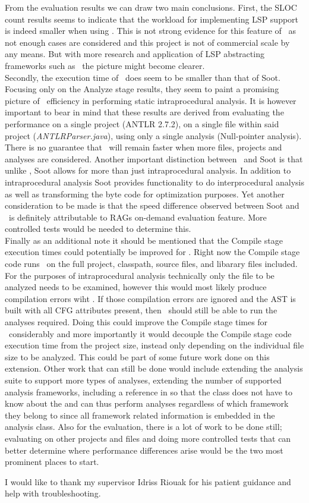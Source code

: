 \documentclass[sigplan,10pt]{acmart}
\begin{document}
From the evaluation results we can draw two main conclusions. First, the SLOC count results seems to indicate that the workload for implementing LSP support is indeed smaller when using \magpie. This is not strong evidence for this feature of \magpie\ as not enough cases are considered and this project is not of commercial scale by any means. But with more research and application of LSP abstracting frameworks such as \magpie\ the picture might become clearer. 
\\
Secondly, the execution time of \intraj\ does seem to be smaller than that of Soot. Focusing only on the Analyze stage results, they seem to paint a promising picture of \intraj\ efficiency in performing static intraprocedural analysis. It is however important to bear in mind that these results are derived from evaluating the performance on a single project (ANTLR 2.7.2), on a single file within said project (\textit{ANTLRParser.java}), using only a single analysis (Null-pointer analysis). There is no guarantee that \intraj\ will remain faster when more files, projects and analyses are considered. Another important distinction between \intraj\ and Soot is that unlike \intraj, Soot allows for more than just intraprocedural analysis. In addition to intraprocedural analysis Soot provides functionality to do interprocedural analysis as well as transforming the byte code for optimization purposes. Yet another consideration to be made is that the speed difference observed between Soot and \intraj\ is definitely attributable to RAGs on-demand evaluation feature. More controlled tests would be needed to determine this.
\\
Finally as an additional note it should be mentioned that the Compile stage execution times could potentially be improved for \intraj. Right now the Compile stage code runs \intraj\ on the full project, classpath, source files, and libarary files included. For the purposes of intraprocedural analysis technically only the file to be analyzed needs to be examined, however this would most likely produce compilation errors wiht \intraj. If those compilation errors are ignored and the AST is built with all CFG attributes present, then \intraj\ should still be able to run the analyses required. Doing this could improve the Compile stage times for \intraj\ considerably and more importantly it would decouple the Compile stage code execution time from the project size, instead only depending on the individual file size to be analyzed. This could be part of some future work done on this extension. Other work that can still be done would include extending the analysis suite to support more types of analyses, extending the number of supported analysis frameworks, including a  reference in  so that the  class does not have to know about the  and can thus perform analyses regardless of which framework they belong to since all framework related information is embedded in the analysis class. Also for the evaluation, there is a lot of work to be done still; evaluating on other projects and files and doing more controlled tests that can better determine where performance differences arise would be the two most prominent places to start.

\begin{acks}
I would like to thank my supervisor Idriss Riouak for his patient guidance and help with troubleshooting.
\end{acks}



\end{document}
